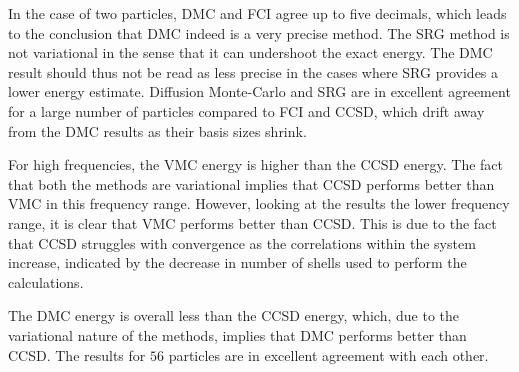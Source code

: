 In the case of two particles, DMC and FCI agree up to five decimals, which leads to the conclusion that DMC indeed is a very precise method. The SRG method is not variational in the sense that it can undershoot the exact energy. The DMC result should thus not be read as less precise in the cases where SRG provides a lower energy estimate. Diffusion Monte-Carlo and SRG are in excellent agreement for a large number of particles compared to FCI and CCSD, which drift away from the DMC results as their basis sizes shrink. 

For high frequencies, the VMC energy is higher than the CCSD energy. The fact that both the methods are variational implies that CCSD performs better than VMC in this frequency range. However, looking at the results the lower frequency range, it is clear that VMC performs better than CCSD. This is due to the fact that CCSD struggles with convergence as the correlations within the system increase, indicated by the decrease in number of shells used to perform the calculations.

The DMC energy is overall less than the CCSD energy, which, due to the variational nature of the methods, implies that DMC performs better than CCSD. The results for $56$ particles are in excellent agreement with each other. 

